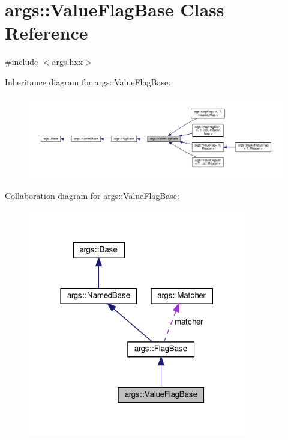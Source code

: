 \hypertarget{classargs_1_1_value_flag_base}{}\section{args\+:\+:Value\+Flag\+Base Class Reference}
\label{classargs_1_1_value_flag_base}


{\ttfamily \#include $<$args.\+hxx$>$}



Inheritance diagram for args\+:\+:Value\+Flag\+Base\+:\nopagebreak
\begin{figure}[H]
\begin{center}
\leavevmode
\includegraphics[width=350pt]{classargs_1_1_value_flag_base__inherit__graph}
\end{center}
\end{figure}


Collaboration diagram for args\+:\+:Value\+Flag\+Base\+:\nopagebreak
\begin{figure}[H]
\begin{center}
\leavevmode
\includegraphics[width=270pt]{classargs_1_1_value_flag_base__coll__graph}
\end{center}
\end{figure}
